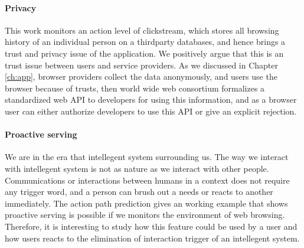 \paragraph{Privacy}
This work monitors an action level of clickstream, which stores all browsing history of an
individual person on a thirdparty databases, and hence brings a trust and privacy issue of
the application. We positively argue that this is an trust issue between users and service providers.
As we discussed in Chapter \ref{ch:app}, browser providers collect the data anonymously,
and users use the browser because of trusts, then world wide web consortium formalizes
a standardized web API to developers for using this information, and as a browser user can
either authorize developers to use this API or give an explicit rejection.

\paragraph{Proactive serving} 
We are in the era that intellegent system surrounding us. The way we interact with intellegent system
is not as nature as we interact with other people. 
Communications or interactions between humans in a context does not require any trigger word,
and a person can brush out a needs or reacts to another immediately.
The action path prediction gives an working example that shows proactive serving is possible
if we monitors the environment of web browsing. Therefore, it is interesting to study
how this feature could be used by a user and how users reacts to the elimination of interaction trigger
of an intellegent system.

\cleardoublepage